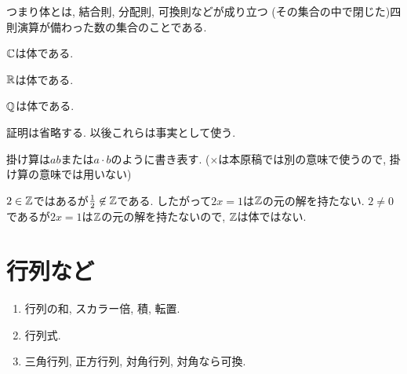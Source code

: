 \begin{remark}
  つまり体とは,
  結合則, 分配則, 可換則などが成り立つ
  (その集合の中で閉じた)四則演算が備わった数の集合のことである.
\end{remark}


\begin{example}
  $\mathbb{C}$は体である.
\end{example}
\begin{example}
  $\mathbb{R}$は体である.
\end{example}
\begin{example}
  $\mathbb{Q}$は体である.
\end{example}
\begin{remark}
  証明は省略する.
  以後これらは事実として使う.
\end{remark}
\begin{remark}
  掛け算は$ab$または$a\cdot b$のように書き表す.
  ($\times$は本原稿では別の意味で使うので,
  掛け算の意味では用いない)
\end{remark}


\begin{example}
  $2\in\mathbb{Z}$ではあるが$\frac{1}{2}\not\in \mathbb{Z}$である.
  したがって$2x=1$は$\mathbb{Z}$の元の解を持たない.
  $2\neq 0$であるが$2x=1$は$\mathbb{Z}$の元の解を持たないので,
  $\mathbb{Z}$は体ではない.
\end{example}


\section{行列など}
\begin{enumerate}
\item 行列の和, スカラー倍, 積, 転置.
\item 行列式.
\item 三角行列, 正方行列, 対角行列, 対角なら可換.
\end{enumerate}



